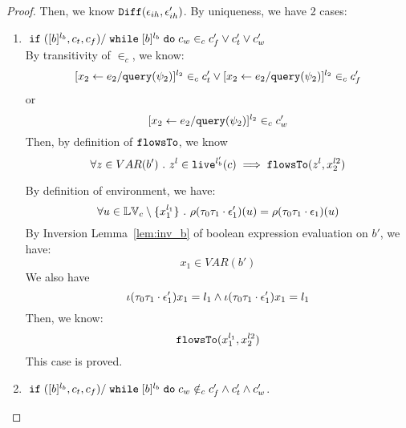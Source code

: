 \begin{proof}
%
Then, we know $\mathtt{Diff}(\mathtt{\epsilon}_{ih}, \mathtt{\epsilon}_{ih}')$. By uniqueness, we have 2 cases:
\begin{enumerate}
  \item $\;\mathtt{if}\;([b]{}^{l_b}, c_t, c_f) / \;\mathtt{while}\; [b]{}^{l_b} \;\mathtt{do}\; c_w \in_c c_f' \lor c_t' \lor c_w'$
  \\
  By transitivity of $\in_c$, we know:
  \[
  [\mathrel{ {x}_2 \leftarrow e_2 / {\tt query}(\psi_2) }]^{l_2} \in_c c_t'
  \lor
  [\mathrel{ {x}_2 \leftarrow e_2 / {\tt query}(\psi_2) }]^{l_2} \in_c c_f'
\]
or
\[
    [\mathrel{ {x}_2 \leftarrow e_2 / {\tt query}(\psi_2) }]^{l_2} \in_c c_w'
\]
%
Then, by definition of $\mathtt{flowsTo}$, we know
\begin{equation}
 \forall z \in VAR(b') ~.~ z^l \in \mathtt{live}^{l_b'}(c) \implies \mathtt{flowsTo}(z^l, x_2^{l2})
\end{equation} 

 By definition of environment, we have:
\[
  \forall u \in \mathbb{LV}_c \setminus \{x_1^{l_1}\} ~.~
  \rho(\mathtt{\tau}_0 \mathtt{\tau}_1 \cdot \mathtt{\epsilon}_1') (u) =  
  \rho(\mathtt{\tau}_0 \mathtt{\tau}_1 \cdot \mathtt{\epsilon}_1) (u)
\]
%
By {Inversion Lemma~\ref{lem:inv_b}} of boolean expression evaluation on $b'$, we have:
 \[
  x_1 \in VAR(b')
 \]
 We also have 
 $$
 \iota(\mathtt{\tau}_0 \mathtt{\tau}_1 \cdot \mathtt{\epsilon}_1') x_1 = l_1
 \land 
 \iota(\mathtt{\tau}_0 \mathtt{\tau}_1 \cdot \mathtt{\epsilon}_1') x_1 = l_1
 $$
 Then, we know:
 \[
 \mathtt{flowsTo}(x_1^{l_1}, x_2^{l2})
 \]
 This case is proved.
\item $\;\mathtt{if}\;([b]{}^{l_b}, c_t, c_f) / \;\mathtt{while}\; [b]{}^{l_b} \;\mathtt{do}\; c_w \notin_c c_f' \land c_t' \land c_w'$.


\end{enumerate}
\end{proof}
